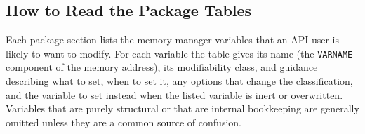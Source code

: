 \subsection{How to Read the Package Tables}

Each package section lists the memory-manager variables that an API user is
likely to want to modify. For each variable the table gives its name (the
\texttt{VARNAME} component of the memory address), its modifiability class, and
guidance describing what to set, when to set it, any options that change the
classification, and the variable to set instead when the listed variable is
inert or overwritten. Variables that are purely structural or that are internal
bookkeeping are generally omitted unless they are a common source of confusion.
